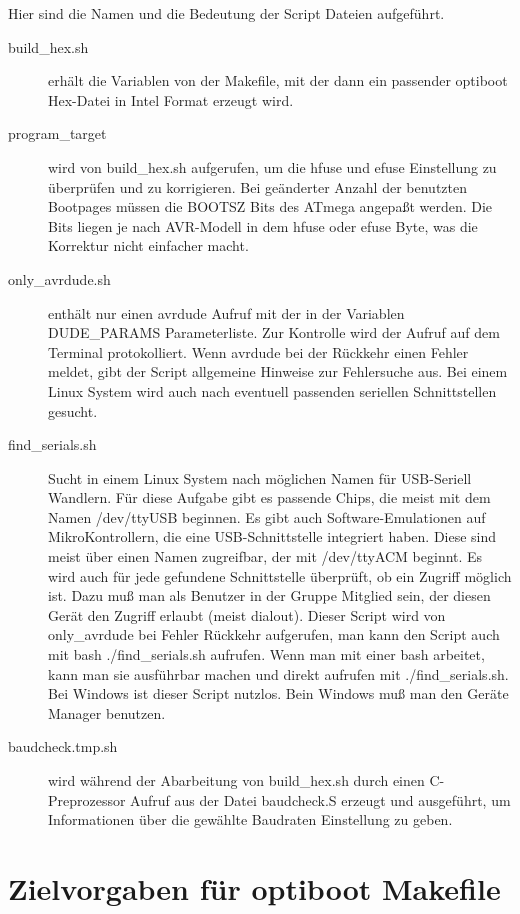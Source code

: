 Hier sind die Namen und die Bedeutung der Script Dateien aufgeführt.
\begin{description}
\item [build\_hex.sh] erhält die Variablen von der Makefile, mit der dann ein passender
optiboot Hex-Datei in Intel Format erzeugt wird.
\item [program\_target] wird von build\_hex.sh aufgerufen, um die hfuse und efuse Einstellung
zu überprüfen und zu korrigieren. Bei geänderter Anzahl der benutzten Bootpages
müssen die BOOTSZ Bits des ATmega angepaßt werden. Die Bits liegen je nach AVR-Modell
in dem hfuse oder efuse Byte, was die Korrektur nicht einfacher macht.
\item [only\_avrdude.sh] enthält nur einen avrdude Aufruf mit der in der Variablen
DUDE\_PARAMS Parameterliste. Zur Kontrolle wird der Aufruf auf dem Terminal protokolliert.
Wenn avrdude bei der Rückkehr einen Fehler meldet, gibt der Script allgemeine Hinweise
zur Fehlersuche aus. Bei einem Linux System wird auch nach eventuell passenden 
seriellen Schnittstellen gesucht.
\item [find\_serials.sh] Sucht in einem Linux System nach möglichen Namen für USB-Seriell
Wandlern. Für diese Aufgabe gibt es passende Chips, die meist mit dem Namen /dev/ttyUSB
beginnen. Es gibt auch Software-Emulationen auf MikroKontrollern, die eine USB-Schnittstelle
integriert haben. Diese sind meist über einen Namen zugreifbar, der mit /dev/ttyACM beginnt.
Es wird auch für jede gefundene Schnittstelle überprüft, ob ein Zugriff möglich ist.
Dazu muß man als Benutzer in der Gruppe Mitglied sein, der diesen Gerät den Zugriff
erlaubt (meist dialout).
Dieser Script wird von only\_avrdude bei Fehler Rückkehr aufgerufen, man kann den
Script auch mit bash ./find\_serials.sh aufrufen.
Wenn man mit einer bash arbeitet, kann man sie ausführbar machen und direkt aufrufen
mit ./find\_serials.sh.
Bei Windows ist dieser Script nutzlos. Bein Windows muß man den Geräte Manager benutzen.
\item [baudcheck.tmp.sh] wird während der Abarbeitung von build\_hex.sh durch einen
C-Preprozessor Aufruf aus der Datei baudcheck.S erzeugt und ausgeführt, um Informationen
über die gewählte Baudraten Einstellung zu geben.
\end{description}

\section{Zielvorgaben für optiboot Makefile}

